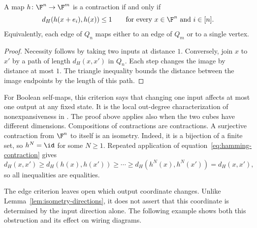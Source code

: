 \begin{lemma}\label{lem:contraction-edges}
    A map $h\colon\F^n\to\F^m$ is a contraction if and only if
    \begin{equation}\label{eq:contraction-edges}
        d_H(h(x+e_i),h(x))\le1
        \qquad\text{for every }x\in\F^n\text{ and }i\in[n].
    \end{equation}
    Equivalently, each edge of $Q_n$ maps either to an edge of $Q_m$ or to a single vertex.
\end{lemma}

\begin{proof}
    Necessity follows by taking two inputs at distance $1$. Conversely, join $x$ to $x'$ by a path of length $d_H(x,x')$ in $Q_n$. Each step changes the image by distance at most $1$. The triangle inequality bounds the distance between the image endpoints by the length of this path.
\end{proof}

For Boolean self-maps, this criterion says that changing one input affects at most one output at any fixed state. It is the local out-degree characterization of nonexpansiveness in \cite[Proposition~2]{richard2011nonexpansive}. The proof above applies also when the two cubes have different dimensions. Compositions of contractions are contractions. A surjective contraction from $\F^n$ to itself is an isometry. Indeed, it is a bijection of a finite set, so $h^N=\id$ for some $N\ge1$. Repeated application of equation~\eqref{eq:hamming-contraction} gives
\[
    d_H(x,x')\ge d_H(h(x),h(x'))\ge\cdots
    \ge d_H(h^N(x),h^N(x'))=d_H(x,x'),
\]
so all inequalities are equalities.

The edge criterion leaves open which output coordinate changes. Unlike Lemma~\ref{lem:isometry-directions}, it does not assert that this coordinate is determined by the input direction alone. The following example shows both this obstruction and its effect on wiring diagrams.

